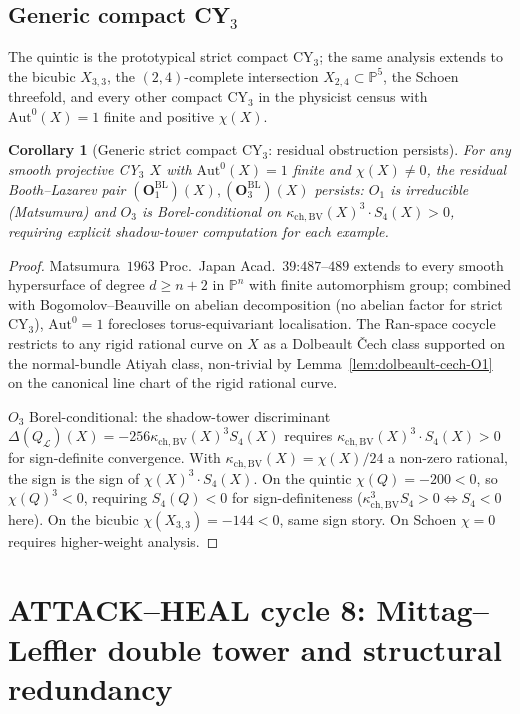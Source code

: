 \documentclass[11pt]{amsart}
\newtheorem{corollary}[theorem]{Corollary}
\newcommand{\kchBV}{\kappa_{\mathrm{ch},\mathrm{BV}}}
\newcommand{\cL}{\mathcal{L}}
\newcommand{\bP}{\mathbb{P}}
\newcommand{\Aut}{\mathrm{Aut}}
\begin{document}
\subsection{Generic compact CY$_3$}

The quintic is the prototypical strict compact CY$_3$; the same
analysis extends to the bicubic $X_{3, 3}$, the $(2, 4)$-complete
intersection $X_{2, 4} \subset \bP^5$, the Schoen threefold, and
every other compact CY$_3$ in the physicist census with
$\Aut^0(X) = 1$ finite and positive $\chi(X)$.

\begin{corollary}[Generic strict compact CY$_3$: residual
obstruction persists]
\label{cor:generic-compact}
For any smooth projective CY$_3$ $X$ with $\Aut^0(X) = 1$ finite and
$\chi(X) \neq 0$, the residual Booth--Lazarev pair
$(\mathbf{O}_1^{\mathrm{BL}})(X), (\mathbf{O}_3^{\mathrm{BL}})(X)$
persists: $O_1$ is irreducible (Matsumura) and $O_3$ is Borel-conditional
on $\kchBV(X)^3 \cdot S_4(X) > 0$, requiring explicit shadow-tower
computation for each example.
\end{corollary}

\begin{proof}
Matsumura~$1963$ Proc.\ Japan Acad.\ 39:$487$--$489$ extends to every
smooth hypersurface of degree $d \geq n + 2$ in $\bP^n$ with finite
automorphism group; combined with Bogomolov--Beauville on abelian
decomposition (no abelian factor for strict CY$_3$), $\Aut^0 = 1$
forecloses torus-equivariant localisation. The
Ran-space cocycle restricts to any rigid rational curve on $X$ as
a Dolbeault \v{C}ech class supported on the normal-bundle Atiyah
class, non-trivial by Lemma~\ref{lem:dolbeault-cech-O1} on the
canonical line chart of the rigid rational curve.

$O_3$ Borel-conditional: the shadow-tower discriminant
$\Delta(Q_\cL)(X) = -256 \kchBV(X)^3 S_4(X)$ requires $\kchBV(X)^3
\cdot S_4(X) > 0$ for sign-definite convergence. With
$\kchBV(X) = \chi(X)/24$ a non-zero rational, the sign is the sign
of $\chi(X)^3 \cdot S_4(X)$. On the quintic $\chi(Q) = -200 < 0$,
so $\chi(Q)^3 < 0$, requiring $S_4(Q) < 0$ for sign-definiteness
($\kchBV^3 S_4 > 0 \iff S_4 < 0$ here). On the bicubic
$\chi(X_{3, 3}) = -144 < 0$, same sign story. On Schoen
$\chi = 0$ requires higher-weight analysis.
\end{proof}

\section{ATTACK--HEAL cycle 8: Mittag--Leffler double tower and
structural redundancy}
\label{sec:cycle-8-double-tower}
\end{document}
